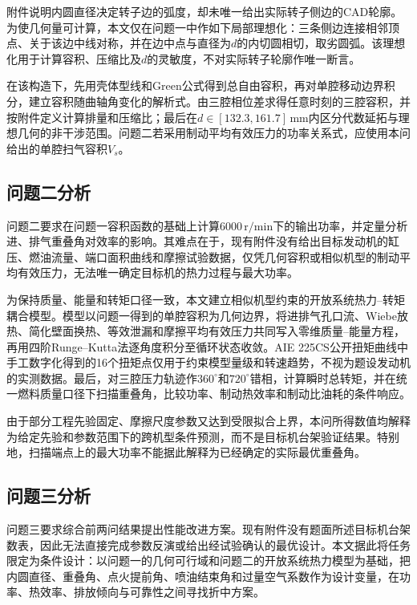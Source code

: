 \documentclass[withoutpreface,bwprint]{cumcmthesis}
\begin{document}
附件说明内圆直径决定转子边的弧度，却未唯一给出实际转子侧边的CAD轮廓。为使几何量可计算，本文仅在问题一中作如下局部理想化：三条侧边连接相邻顶点、关于该边中线对称，并在边中点与直径为$d$的内切圆相切，取劣圆弧。该理想化用于计算容积、压缩比及$d$的灵敏度，不对实际转子轮廓作唯一断言。

在该构造下，先用壳体型线和Green公式得到总自由容积，再对单腔移动边界积分，建立容积随曲轴角变化的解析式。由三腔相位差求得任意时刻的三腔容积，并按附件定义计算排量和压缩比；最后在$d\in[132.3,161.7]\,\mathrm{mm}$内区分代数延拓与理想几何的非干涉范围。问题二若采用制动平均有效压力的功率关系式，应使用本问给出的单腔扫气容积$V_s$。

\subsection{问题二分析}
问题二要求在问题一容积函数的基础上计算$6000\,\mathrm{r/min}$下的输出功率，并定量分析进、排气重叠角对效率的影响。其难点在于，现有附件没有给出目标发动机的缸压、燃油流量、端口面积曲线和摩擦试验数据，仅凭几何容积或相似机型的制动平均有效压力，无法唯一确定目标机的热力过程与最大功率。

为保持质量、能量和转矩口径一致，本文建立相似机型约束的开放系统热力--转矩耦合模型。模型以问题一得到的单腔容积为几何边界，将进排气孔口流、Wiebe放热、简化壁面换热、等效泄漏和摩擦平均有效压力共同写入零维质量--能量方程，再用四阶Runge--Kutta法逐角度积分至循环状态收敛。AIE 225CS公开扭矩曲线中手工数字化得到的16个扭矩点仅用于约束模型量级和转速趋势，不视为题设发动机的实测数据。最后，对三腔压力轨迹作$360^\circ$和$720^\circ$错相，计算瞬时总转矩，并在统一燃料质量口径下扫描重叠角，比较功率、制动热效率和制动比油耗的条件响应。

由于部分工程先验固定、摩擦尺度参数又达到受限拟合上界，本问所得数值均解释为给定先验和参数范围下的跨机型条件预测，而不是目标机台架验证结果。特别地，扫描端点上的最大功率不能据此解释为已经确定的实际最优重叠角。

\subsection{问题三分析}
问题三要求综合前两问结果提出性能改进方案。现有附件没有题面所述目标机台架数表，因此无法直接完成参数反演或给出经试验确认的最优设计。本文据此将任务限定为条件设计：以问题一的几何可行域和问题二的开放系统热力模型为基础，把内圆直径、重叠角、点火提前角、喷油结束角和过量空气系数作为设计变量，在功率、热效率、排放倾向与可靠性之间寻找折中方案。
\end{document}
